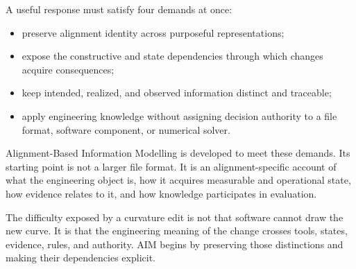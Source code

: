 A useful response must satisfy four demands at once:

\begin{itemize}
\item preserve alignment identity across purposeful representations;
\item expose the constructive and state dependencies through which changes
  acquire consequences;
\item keep intended, realized, and observed information distinct and traceable;
\item apply engineering knowledge without assigning decision authority to a
  file format, software component, or numerical solver.
\end{itemize}

Alignment-Based Information Modelling is developed to meet these demands. Its
starting point is not a larger file format. It is an alignment-specific account
of what the engineering object is, how it acquires measurable and operational
state, how evidence relates to it, and how knowledge participates in
evaluation.

\begin{summary}
The difficulty exposed by a curvature edit is not that software cannot draw the
new curve. It is that the engineering meaning of the change crosses tools,
states, evidence, rules, and authority. AIM begins by preserving those
distinctions and making their dependencies explicit.
\end{summary}
